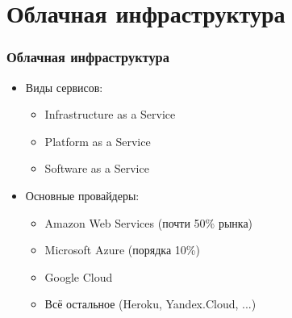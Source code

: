 \documentclass{../../slides-style}
\begin{document}
    \section{Облачная инфраструктура}

    \begin{frame}
        \frametitle{Облачная инфраструктура}
        \begin{itemize}
            \item Виды сервисов:
            \begin{itemize}
                \item Infrastructure as a Service
                \item Platform as a Service
                \item Software as a Service
            \end{itemize}
            \item Основные провайдеры:
            \begin{itemize}
                \item Amazon Web Services (почти 50\% рынка)
                \item Microsoft Azure (порядка 10\%)
                \item Google Cloud
                \item Всё остальное (Heroku, Yandex.Cloud, ...)
            \end{itemize}
        \end{itemize}
    \end{frame}

\end{document}
